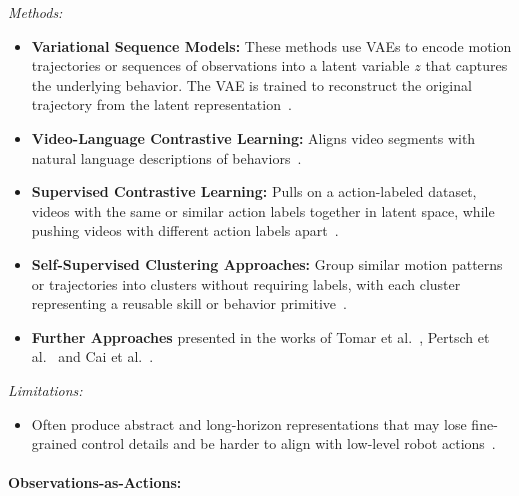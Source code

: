 \textit{Methods:}
\begin{itemize}
    \item \textbf{Variational Sequence Models:} These methods use \acp{VAE} to encode motion trajectories or sequences of observations into a latent variable $z$ that captures the underlying behavior. The VAE is trained to reconstruct the original trajectory from the latent representation~\cite{Wang2023MimicPlayLI}.    
    \item \textbf{Video-Language Contrastive Learning:} Aligns video segments with natural language descriptions of behaviors~\cite{fan2022minedojo, Lifshitz2023STEVE1AG, Sontakke2023RoboCLIPOD}.
    \item \textbf{Supervised Contrastive Learning:} Pulls on a action-labeled dataset, videos with the same or similar action labels together in latent space, while pushing videos with different action labels apart~\cite{ChaneSane2023LearningVP, Chen2021LearningGR}.
    \item \textbf{Self-Supervised Clustering Approaches:} Group similar motion patterns or trajectories into clusters without requiring labels, with each cluster representing a reusable skill or behavior primitive~\cite{Xu2023XSkillCE}.
    \item \textbf{Further Approaches} presented in the works of Tomar et al.~\cite{tomar2023video}, Pertsch et al.~\cite{Pertsch2022CrossDomainTV} and Cai et al.~\cite{Cai2023GROOTLT}. 
\end{itemize}

\textit{Limitations:}
\begin{itemize}
    \item Often produce abstract and long-horizon representations that may lose fine-grained control details and be harder to align with low-level robot actions~\cite{kim2026hierarchical, liang2025clam}.
\end{itemize}






\paragraph{Observations-as-Actions:}

